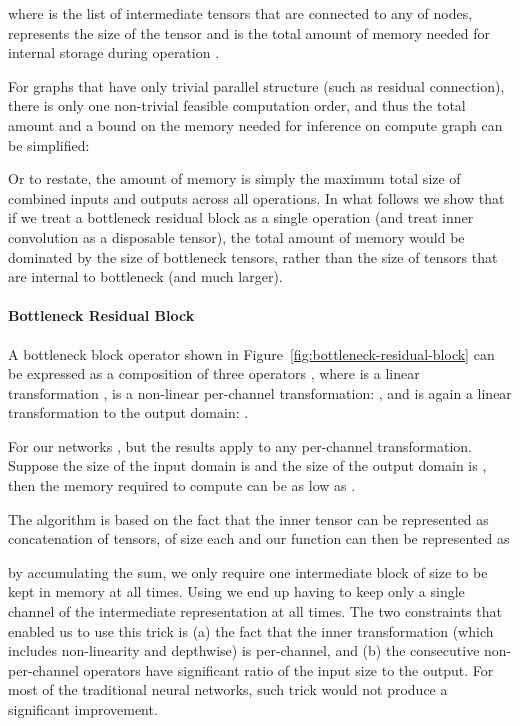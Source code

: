 \documentclass[10pt,twocolumn,letterpaper]{article}
\begin{document}
where  is the list of intermediate tensors that are connected to any of  nodes,  represents the size of the tensor  and
 is the total amount of memory needed for internal storage during operation .

For graphs that have only trivial parallel structure (such as residual connection), there is only one non-trivial feasible computation order, and thus the total amount and a  bound  on the memory needed for inference on compute graph  can be simplified: 

Or to restate, the amount of memory is simply the maximum total size of combined inputs and outputs across all operations. In what follows we show that if we treat a bottleneck residual block as a single operation (and treat inner convolution
as a disposable tensor), the total amount of memory would be dominated by the size of bottleneck tensors, rather than the size of tensors that are internal to bottleneck (and much larger). 

\paragraph{Bottleneck Residual Block}
\def\F{{\cal F}}
\def\N{{\cal N}}
A bottleneck block operator  shown in Figure~\ref{fig:bottleneck-residual-block} can be expressed as a composition of three
operators , where  is a linear
transformation ,   is a non-linear per-channel transformation: , and  is again a linear transformation to the output domain: .

For our networks , but the results apply to any per-channel transformation. Suppose the size of the input domain is  and the size of the output domain is , then the memory required to compute  can be as low as .

The algorithm is based on the fact that the inner tensor  can be represented as concatenation of  tensors, of size  each 
and our function can then be represented as 
 
by  accumulating the sum, we only require one intermediate block of size  to be kept in memory at all times. Using  we end up having to keep only a single channel of the intermediate representation at all times. The two constraints that enabled us to use this trick is (a) the fact that the inner transformation (which includes non-linearity and depthwise) is per-channel, and (b) the consecutive non-per-channel operators have significant ratio of the input size to the output. For most of the traditional neural networks, such trick would not produce a significant improvement. 
\end{document}
